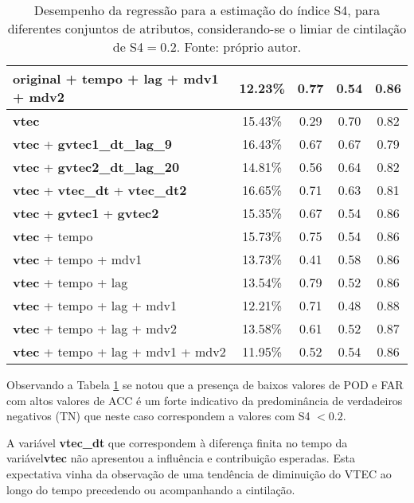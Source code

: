 \begin{table}
\begin{center}
\begin{tabular}{|l|c|c|c|c|}
original + tempo + lag + mdv1 + mdv2	       & 12.23\%	& 0.77	& 0.54	& 0.86 \\ \hline
{\bf vtec}	                               & 15.43\%	& 0.29	& 0.70	& 0.82 \\ \hline
{\bf vtec} + {\bf gvtec1\_dt\_lag\_9}          & 16.43\%        & 0.67  & 0.67  & 0.79 \\ \hline
{\bf vtec} + {\bf gvtec2\_dt\_lag\_20}         & 14.81\%        & 0.56  & 0.64  & 0.82 \\ \hline
{\bf vtec} + {\bf vtec\_dt} + {\bf vtec\_dt2}  & 16.65\%	& 0.71	& 0.63	& 0.81 \\ \hline
{\bf vtec} + {\bf gvtec1} + {\bf gvtec2}       & 15.35\%	& 0.67	& 0.54	& 0.86 \\ \hline
{\bf vtec} + tempo	                       & 15.73\%	& 0.75	& 0.54	& 0.86 \\ \hline
{\bf vtec} + tempo + mdv1	               & 13.73\%	& 0.41	& 0.58	& 0.86 \\ \hline
{\bf vtec} + tempo + lag	               & 13.54\%	& 0.79	& 0.52	& 0.86 \\ \hline
{\bf vtec} + tempo + lag + mdv1	               & 12.21\%	& 0.71	& 0.48	& 0.88 \\ \hline
{\bf vtec} + tempo + lag + mdv2	               & 13.58\%	& 0.61	& 0.52	& 0.87 \\ \hline
{\bf vtec} + tempo + lag + mdv1 + mdv2	       & 11.95\%	& 0.52	& 0.54	& 0.86 \\ \hline
\end{tabular}
\end{center}
\vspace{12pt}
\caption{Desempenho da regressão para a estimação do índice S4, para diferentes conjuntos de atributos, considerando-se o limiar de cintilação de S4$=0.2$. Fonte: próprio autor.}
\label{tab:final_result}
\end{table}

Observando a Tabela \ref{tab:final_result} se notou que a presença de baixos valores de POD e FAR com altos valores de ACC é um forte indicativo da predominância de verdadeiros negativos (TN) que neste caso correspondem a valores com S4 $<0.2$.

A variável {\bf vtec\_dt} que correspondem à diferença finita no tempo da variável{\bf vtec} não apresentou a influência e contribuição esperadas. Esta expectativa vinha da observação de uma tendência de diminuição do VTEC ao longo do tempo precedendo ou acompanhando a cintilação. 

